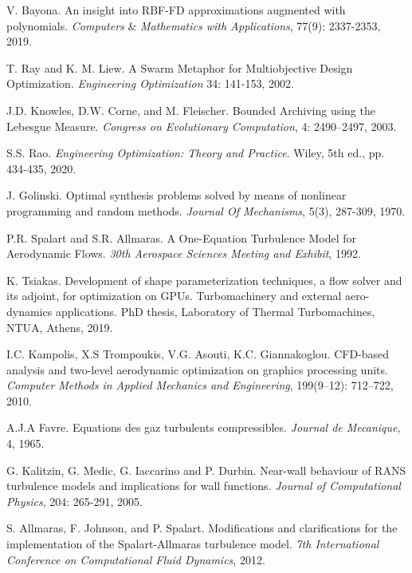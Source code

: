 \documentclass[twoside, 12pt,notitlepage]{report}
\begin{document}
\begin{thebibliography}{9}
V. Bayona. An insight into RBF-FD approximations augmented 
with polynomials. \textit{Computers} \& 
\textit{Mathematics with Applications}, 77(9): 2337-2353, 
2019. 

T. Ray and K. M. Liew. A Swarm Metaphor for 
Multiobjective Design Optimization. \textit{Engineering 
Optimization} 34: 141-153, 2002.

J.D. Knowles, D.W. Corne, and M. Fleischer. Bounded Archiving 
using the Lebesgue Measure. \textit{Congress on Evolutionary 
Computation}, 4: 2490–2497, 2003.

S.S. Rao. \textit{Engineering Optimization: Theory and 
Practice}. Wiley, 5th ed., pp. 434-435, 2020.

J. Golinski. Optimal synthesis problems solved by means of 
nonlinear programming and random methods. \textit{Journal Of 
Mechanisms}, 5(3), 287-309, 1970.

P.R. Spalart and S.R. Allmaras. A One-Equation Turbulence Model 
for Aerodynamic Flows. \textit{30th Aerospace Sciences Meeting and 
Exhibit}, 1992.

K. Tsiakas. Development of shape parameterization techniques, a 
flow solver and its adjoint, for optimization on GPUs. 
Turbomachinery and external aero-dynamics applications. PhD thesis, 
Laboratory of Thermal Turbomachines, NTUA, Athens, 2019.

I.C. Kampolis, X.S Trompoukis, V.G. Asouti, K.C. Giannakoglou. 
CFD-based analysis and two-level aerodynamic optimization on 
graphics processing units. \textit{Computer Methods in Applied 
Mechanics and Engineering}, 199(9–12): 712–722, 2010.

A.J.A Favre. Equations des gaz turbulents compressibles. 
\textit{Journal de Mecanique}, 4, 1965.

G. Kalitzin, G. Medic, G. Iaccarino and P. Durbin. Near-wall 
behaviour of RANS turbulence models and implications for wall 
functions. \textit{Journal of Computational Physics}, 204: 265-291,
2005.

S. Allmaras, F. Johnson, and P. Spalart. Modifications and 
clarifications for the implementation of the Spalart-Allmaras 
turbulence model. \textit{7th International Conference on 
Computational Fluid Dynamics}, 2012.


\end{thebibliography}
\end{document}
